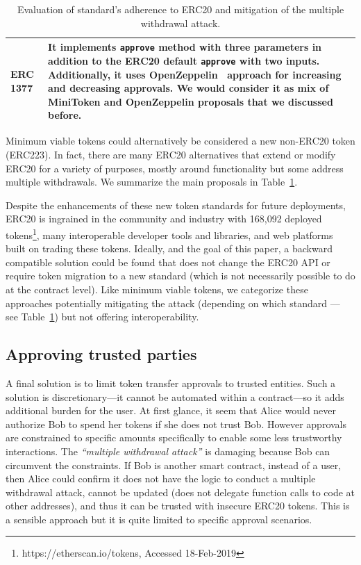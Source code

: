 \begin{table}
\begin{tabular}{|m{1.8cm}|m{14.5cm}|}
	\hline\centering 
	ERC 1377 \cite{Ref26} & It implements \texttt{approve} method with three parameters in addition to the ERC20 default \texttt{approve} with two inputs. Additionally, it uses OpenZeppelin~\cite{Ref10} approach for increasing and decreasing approvals. We would consider it as mix of MiniToken and OpenZeppelin proposals that we discussed before.\\
	\hline
\end{tabular}
\newline
\caption{Evaluation of standard's adherence to ERC20 and mitigation of the multiple withdrawal attack.\label{tab:erc}}
\end{table}

Minimum viable tokens could alternatively be considered a new non-ERC20 token (\cf ERC223). In fact, there are many ERC20 alternatives that extend or modify ERC20 for a variety of purposes, mostly around functionality but some address multiple withdrawals. We summarize the main proposals in Table~\ref{tab:erc}. 

Despite the enhancements of these new token standards for future deployments, ERC20 is ingrained in the community and industry with 168,092 deployed tokens\footnote{https://etherscan.io/tokens, Accessed 18-Feb-2019}, many interoperable developer tools and libraries, and web platforms built on trading these tokens. Ideally, and the goal of this paper, a backward compatible solution could be found that does not change the ERC20 API or require token migration to a new standard (which is not necessarily possible to do at the contract level). Like minimum viable tokens, we categorize these approaches potentially mitigating the attack (depending on which standard --- see Table~\ref{tab:erc}) but not offering interoperability.


\subsection{Approving trusted parties}

A final solution is to limit token transfer approvals to trusted entities. Such a solution is discretionary---it cannot be automated within a contract---so it adds additional burden for the user. At first glance, it seem that Alice would never authorize Bob to spend her tokens if she does not trust Bob. However approvals are constrained to specific amounts specifically to enable some less trustworthy interactions. The \textit{``multiple withdrawal attack''} is damaging because Bob can circumvent the constraints. If Bob is another smart contract, instead of a user, then Alice could confirm it does not have the logic to conduct a multiple withdrawal attack, cannot be updated (\eg does not delegate function calls to code at other addresses), and thus it can be trusted with insecure ERC20 tokens. This is a sensible approach but it is quite limited to specific approval scenarios.
